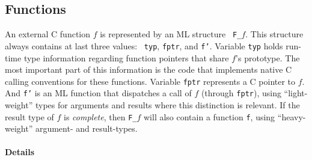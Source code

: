 \documentclass[titlepage,letterpaper]{article}
\begin{document}
\subsection{Functions}

An external C function $f$ is represented by an ML structure {\tt
  F\_}$f$.  This structure always contains at last three values: {\tt
  typ}, {\tt fptr}, and {\tt f'}.  Variable {\tt typ} holds run-time
type information regarding function pointers that share $f$'s
prototype.  The most important part of this information is the code
that implements native C calling conventions for these functions.
Variable {\tt fptr} represents a C pointer to $f$.  And {\tt f'} is an
ML function that dispatches a call of $f$ (through {\tt fptr}), using
``light-weight'' types for arguments and results where this
distinction is relevant.  If the result type of $f$ is {\em complete},
then {\tt F\_}$f$ will also contain a function {\tt f}, using
``heavy-weight'' argument- and result-types.

\paragraph*{Details}
\end{document}
